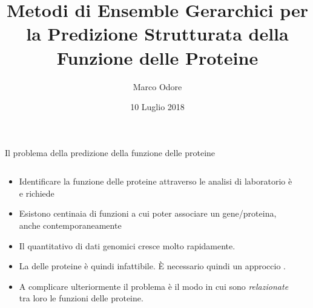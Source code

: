 \documentclass[9pt]{beamer}
\author{Marco Odore}
\title[Metodi di Ensemble Gerarchici]{Metodi di Ensemble Gerarchici per la Predizione Strutturata della Funzione delle Proteine}
\date{10 Luglio 2018}
\begin{document}
\titlepageframe
\begin{tframe}{Il problema della predizione della funzione delle proteine}
  \begin{columns}
    \begin{column}{.65\textwidth}
      \minipage[c][0.4\textheight][s]{\columnwidth}
	   \begin{itemize}	
	  \item Identificare la funzione delle proteine attraverso le analisi di laboratorio è  e richiede 
	  \onslide<2->
	  \item Esistono centinaia di funzioni a cui poter associare un gene/proteina, anche contemporaneamente 
	  \item Il quantitativo di dati genomici cresce molto rapidamente.
	  \item La  delle proteine è quindi infattibile. È necessario quindi un approccio .
	  \onslide<5->
	  \item A complicare ulteriormente il problema è il modo in cui sono \emph{relazionate} tra loro le funzioni delle proteine.
	  \end{itemize}
      \endminipage      
    \end{column}
    \begin{column}{.35\textwidth}
    \end{column}
  \end{columns}
\end{tframe}
\end{document}
